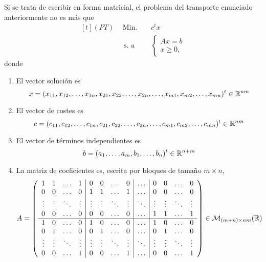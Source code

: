 \documentclass[11pt]{report}
\theoremstyle{mytheorem}
\theoremstyle{mydefinition}
\theoremstyle{myexample}
\newcommand{\R}{\mathbb R}
\begin{document}
Si se trata de escribir en forma matricial, el problema del transporte enunciado anteriormente no es más que
\[\begin{aligned}[t]
(PT) \ \, &\text{Min. } && c^tx \\
& \, \text{s. a} &&\begin{cases}
    Ax = b \\
    x \geq 0,
\end{cases}
\end{aligned}\]
donde
\begin{enumerate}
    \item El vector solución es
    \[x = (x_{11},x_{12},\mathellipsis,x_{1n},x_{21},x_{22},\mathellipsis,x_{2n},\mathellipsis,x_{m1},x_{m2},\mathellipsis,x_{mn})^t \in \R^{nm}\]
    \item El vector de costes es \[c = (c_{11},c_{12},\mathellipsis,c_{1n},c_{21},c_{22},\mathellipsis,c_{2n},\mathellipsis,c_{m1},c_{m2},\mathellipsis,c_{mn})^t \in \R^{nm}\]
    \item El vector de términos independientes es
    \[b = (a_1,\mathellipsis,a_m,b_1,\mathellipsis,b_n)^t \in \R^{n+m}\]
    \item La matriz de coeficientes es, escrita por bloques de tamaño $m \times n$, \[A =\left( \begin{array}{cccc|cccc|c|cccc}
    1 & 1 & \mathellipsis & 1 & 0 & 0 & \mathellipsis & 0 & \mathellipsis & 0 & 0 & \mathellipsis & 0 \\
    0 & 0 & \mathellipsis & 0 & 1 & 1 & \mathellipsis & 1 & \mathellipsis & 0 & 0 & \mathellipsis & 0 \\
    \vdots & \vdots & \ddots & \vdots & \vdots & \vdots & \ddots & \vdots & \ddots & \vdots & \vdots & \ddots & \vdots \\
    0 & 0 & \mathellipsis & 0 & 0 & 0 & \mathellipsis & 0 & \mathellipsis & 1 & 1 & \mathellipsis & 1 \\ \hline
    1 & 0 & \mathellipsis & 0 & 1 & 0 & \mathellipsis & 0 & \mathellipsis & 1 & 0 & \mathellipsis & 0 \\
    0 & 1 & \mathellipsis & 0 & 0 & 1 & \mathellipsis & 0 & \mathellipsis & 0 & 1 & \mathellipsis & 0 \\
    \vdots & \vdots & \ddots & \vdots & \vdots & \vdots & \ddots & \vdots & \ddots & \vdots & \vdots & \ddots & \vdots \\
    0 & 0 & \mathellipsis & 1 & 0 & 0 & \mathellipsis & 1 & \mathellipsis & 0 & 0 & \mathellipsis & 1 \\
    \end{array}\right) \in \mathcal{M}_{(m+n)\times nm}(\R)\]
\end{enumerate}
\end{document}
